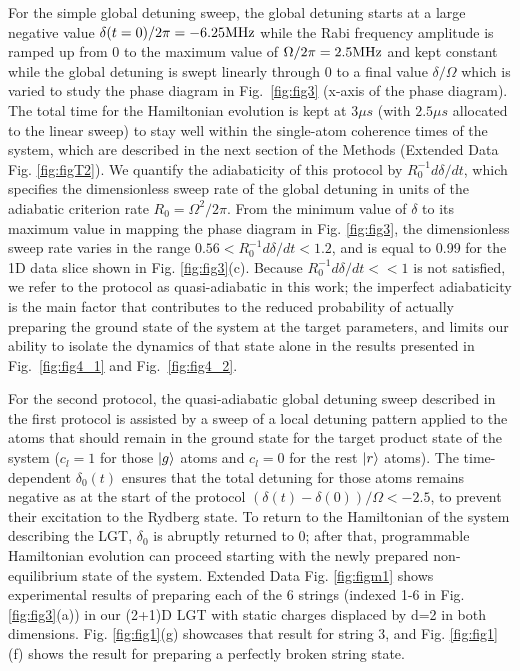 \documentclass[footinbib,a4paper,aps,superscriptaddress,twocolumn,preprintnumbers,amsmath,amssymb,nobalancelastpage,10pt,prl]{revtex4-2}
\begin{document}
{For the simple global detuning sweep, the global detuning starts at a large negative value $ \delta(t=0)/2\pi = -6.25 {\rm MHz}$ while the Rabi frequency amplitude is ramped up from 0 to the maximum value of $\Omega/2\pi = 2.5 {\rm MHz}$ and kept constant while the global detuning is swept linearly through 0 to a final value $\delta/\Omega$ which is varied to study the phase diagram in Fig.~\ref{fig:fig3} (x-axis of the phase diagram). The total time for the Hamiltonian evolution is kept at $3\mu s$ (with $2.5\mu s$ allocated to the linear sweep) to stay well within the single-atom coherence times of the system, which are described in the next section of the Methods (Extended Data Fig. \ref{fig:figT2}). We quantify the adiabaticity of this protocol by $R_0^{-1}d\delta/dt$, which specifies the dimensionless sweep rate of the global detuning in units of the adiabatic criterion rate $R_0=\Omega^2/2\pi$. From the minimum value of $\delta$ to its maximum value in mapping the phase diagram in Fig. \ref{fig:fig3}, the dimensionless sweep rate varies in the range $0.56 < R_0^{-1}d\delta/dt < 1.2$, and is equal to 0.99 for the 1D data slice shown in Fig. \ref{fig:fig3}(c). Because $R_0^{-1}d\delta/dt << 1$ is not satisfied, we refer to the protocol as quasi-adiabatic in this work; the imperfect adiabaticity is the main factor that contributes to the reduced probability of actually preparing the ground state of the system at the target parameters, and limits our ability to isolate the dynamics of that state alone in the results presented in Fig.~\ref{fig:fig4_1} and Fig.~\ref{fig:fig4_2}.

For the second protocol, the quasi-adiabatic global detuning sweep described in the first protocol is assisted by a sweep of a local detuning pattern applied to the atoms that should remain in the ground state for the target product state of the system ($c_l=1$ for those $\ket{g}$ atoms and $c_l=0$ for the rest $\ket{r}$ atoms). The time-dependent $\delta_0(t)$ ensures that the total detuning for those atoms remains negative as at the start of the protocol $(\delta(t)-\delta(0))/\Omega < -2.5 $, to prevent their excitation to the Rydberg state. To return to the Hamiltonian of the system describing the LGT, $\delta_0$ is abruptly returned to 0; after that, programmable Hamiltonian evolution can proceed starting with the newly prepared non-equilibrium state of the system. Extended Data Fig. \ref{fig:figm1} shows experimental results of preparing each of the 6 strings (indexed 1-6 in Fig. \ref{fig:fig3}(a)) in our (2+1)D LGT with static charges displaced by d=2 in both dimensions. Fig. \ref{fig:fig1}(g) showcases that result for string 3, and Fig. \ref{fig:fig1}(f) shows the result for preparing a perfectly broken string state. 

}
\end{document}
